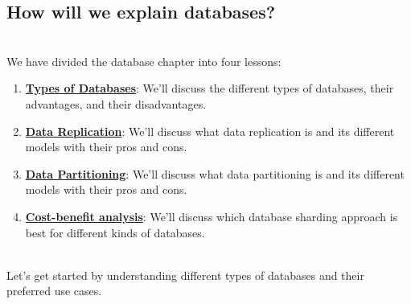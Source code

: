 \subsection{How will we explain databases?}\label{T0U_5IqKBYBmnWTMATD7e}
\\
We have divided the database chapter into four lessons:

\begin{enumerate}
\item
\protect{}\label{Ff_enAWEJeDLUhNh6gitD}
\href{https://www.educative.io/courses/grokking-the-system-design-interview/types-of-databases}{\textbf{Types of Databases}}: We'll discuss the different types of databases, their advantages, and their disadvantages.
\item
\protect{}\label{yKINSzyLWuKsCdmxB74q9}
\href{https://www.educative.io/courses/grokking-the-system-design-interview/data-replication}{\textbf{Data Replication}}: We'll discuss what data replication is and its different models with their pros and cons.
\item
\protect{}\label{iAykAHt3UqpjtA8miUPum}
\href{https://www.educative.io/courses/grokking-the-system-design-interview/data-partitioning}{\textbf{Data Partitioning}}: We'll discuss what data partitioning is and its different models with their pros and cons.
\item
\protect{}\label{_KvPaWf568kg4DsfjxrMi}
\href{https://www.educative.io/courses/grokking-the-system-design-interview/trade-offs-in-databases}{\textbf{Cost-benefit analysis}}: We'll discuss which database sharding approach is best for different kinds of databases.
\end{enumerate}
\\
Let's get started by understanding different types of databases and their preferred use cases.

